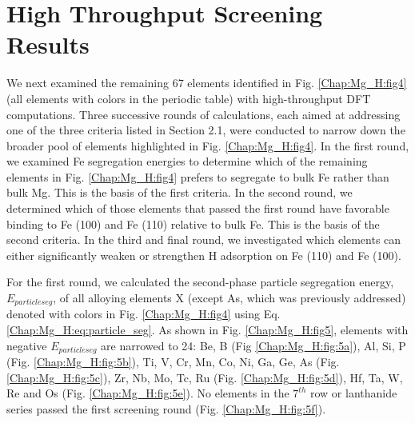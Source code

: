 \section{High Throughput Screening Results}

We next examined the remaining 67 elements identified in Fig. \ref{Chap:Mg_H:fig4} (all elements with colors in the periodic table) with high-throughput DFT computations. Three successive rounds of calculations, each aimed at addressing one of the three criteria listed in Section 2.1, were conducted to narrow down the broader pool of elements highlighted in Fig. \ref{Chap:Mg_H:fig4}. In the first round, we examined Fe segregation energies to determine which of the remaining elements in Fig. \ref{Chap:Mg_H:fig4} prefers to segregate to bulk Fe rather than bulk Mg. This is the basis of the first criteria. In the second round, we determined which of those elements that passed the first round have favorable binding to Fe (100) and Fe (110) relative to bulk Fe. This is the basis of the second criteria. In the third and final round, we investigated which elements can either significantly weaken or strengthen H adsorption on Fe (110) and Fe (100).

For the first round, we calculated the second-phase particle segregation energy, $E_{particle seg}$,  of all alloying elements X (except As, which was previously addressed) denoted with colors in Fig. \ref{Chap:Mg_H:fig4} using Eq. \ref{Chap:Mg_H:eq:particle_seg}. As shown in Fig. \ref{Chap:Mg_H:fig5}, elements with negative $E_{particle seg}$ are narrowed to 24: Be, B (Fig \ref{Chap:Mg_H:fig:5a}), Al, Si, P (Fig. \ref{Chap:Mg_H:fig:5b}), Ti, V, Cr, Mn, Co, Ni, Ga, Ge, As (Fig. \ref{Chap:Mg_H:fig:5c}), Zr, Nb, Mo, Tc, Ru (Fig. \ref{Chap:Mg_H:fig:5d}), Hf, Ta, W, Re and Os (Fig. \ref{Chap:Mg_H:fig:5e}). No elements in the $7^{th}$ row or lanthanide series passed the first screening round (Fig. \ref{Chap:Mg_H:fig:5f}).

